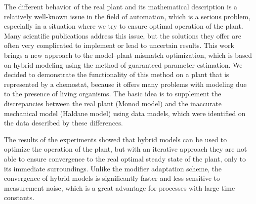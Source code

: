 The different behavior of the real plant and its mathematical description is a relatively well-known issue in the field of automation, which is a serious problem, especially in a situation where we try to ensure optimal operation of the plant. Many scientific publications address this issue, but the solutions they offer are often very complicated to implement or lead to uncertain results. This work brings a new approach to the model--plant mismatch optimization, which is based on hybrid modeling using the method of guaranteed parameter estimation. We decided to demonstrate the functionality of this method on a plant that is represented by a chemostat, because it offers many problems with modeling due to the presence of living organisms. The basic idea is to supplement the discrepancies between the real plant (Monod model) and the inaccurate mechanical model (Haldane model) using data models, which were identified on the data described by these differences.

The results of the experiments showed that hybrid models can be used to optimize the operation of the plant, but  with an iterative approach they are not able to ensure convergence to the real optimal steady state of the plant, only to its immediate surroundings. Unlike the modifier adaptation scheme, the convergence of hybrid models is significantly faster and less sensitive to measurement noise, which is a great advantage for processes with large time constants.